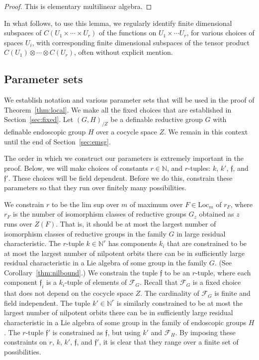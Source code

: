 \documentclass[12pt]{amsart}
\newcommand{\ring}[1]{{\mathbb #1}}
\def\s{{\mathfrak{f}}}
\newcommand{\cF}{\mathcal{F}}
\newcommand{\Loc}{\mathrm{Loc}}
\theoremstyle{plain}
\theoremstyle{definition}
\begin{document}
\begin{proof} This is elementary multilinear algebra.
\end{proof}

In what follows, to use this lemma, we regularly identify finite dimensional subspaces of
$C(U_1\times\cdots\times U_r)$ of the functions on
$U_1\times\cdots U_r$, for various choices of spaces $U_i$, with
corresponding finite dimensional subspaces of the tensor product
$C(U_1)\otimes \cdots\otimes C(U_r)$, often without
explicit mention.

\subsection{Parameter sets}

We establish notation and various parameter sets that will be used in
the proof of Theorem~\ref{thm:local}.  We make all the fixed choices
that are established in Section~\ref{sec:fixed}.  Let $(G,H)_{/Z}$ be
a definable reductive group $G$ with definable endoscopic group $H$
over a cocycle space $Z$.  We remain in this context until the end of
Section~\ref{sec:emsg}.

The order in which we construct our parameters is extremely important
in the proof.  Below, we will make choices of constants
$r\in\ring{N}$, and $r$-tuples: $k$, $k'$, $\s$,
and $\s'$.  These choices will be field dependent.  Before we do this,
constrain these parameters so that they run over finitely many
possibilities.

We constrain $r$ to be the lim sup over $m$ of maximum over
$F\in\Loc_m$ of $r_F$, where $r_F$ is the number of isomorphism
classes of reductive groups $G_z$ obtained as $z$ runs over $Z(F)$.
That is, it should be at most the largest number of isomorphism
classes of reductive groups in the family $G$ in large residual
characteristic.  The $r$-tuple $k\in\ring{N}^r$ has components $k_i$
that are constrained to be at most the largest number of nilpotent
orbits there can be in sufficiently large residual characteristic in a
Lie algebra of some group in the family $G$.  (See
Corollary~\ref{thm:nilbound}.) We constrain the tuple $\s$ to be an
$r$-tuple, where each component $\s_i$ is a $k_i$-tuple of elements of
$\cF_G$. Recall that $\cF_G$ is a fixed choice that does not depend on
the cocycle space $Z$.  The cardinality of $\cF_G$ is finite and field
independent.  The tuple $k'\in\ring{N}^r$ is similarly
constrained to be at most the largest number of nilpotent orbits there
can be in sufficiently large residual characteristic in a Lie algebra
of some group in the family of endoscopic groups $H$.  The $r$-tuple
$\s'$ is constrained as $\s$, but using $k'$ and $\cF_H$.  By imposing
these constraints on $r$, $k$, $k'$, $\s$, and $\s'$, it is clear that
they range over a finite set of possibilities.
\end{document}
